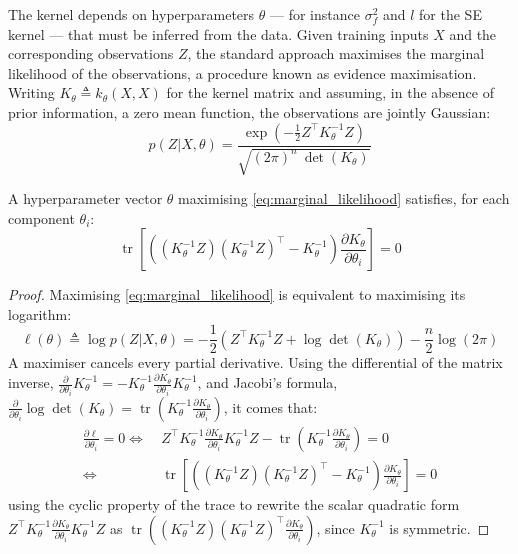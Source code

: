 The kernel depends on hyperparameters $\theta$ --- for instance $\sigma_f^2$ and $l$ for the SE kernel --- that must be inferred from the data. Given training inputs $X$ and the corresponding observations $Z$, the standard approach maximises the marginal likelihood of the observations, a procedure known as evidence maximisation. Writing $K_\theta\triangleq k_\theta(X,X)$ for the kernel matrix and assuming, in the absence of prior information, a zero mean function, the observations are jointly Gaussian:
\begin{equation}
	p(Z|X,\theta)=\frac{\displaystyle\exp\left(-\frac{1}{2}Z^\top K_\theta^{-1}Z\right)}{\sqrt{(2\pi)^n\:\operatorname{det}(K_\theta)}}\label{eq:marginal_likelihood}
\end{equation}

\begin{proposition}\label{th:GP_MLE}
	A hyperparameter vector $\theta$ maximising \eqref{eq:marginal_likelihood} satisfies, for each component $\theta_i$:
	\begin{equation}
		\operatorname{tr}\left[\left((K_\theta^{-1}Z)(K_\theta^{-1}Z)^\top-K_\theta^{-1}\right)\frac{\partial K_\theta}{\partial\theta_i}\right]=0\label{eq:GP_MLE}
	\end{equation}
\end{proposition}

\begin{proof}
	Maximising \eqref{eq:marginal_likelihood} is equivalent to maximising its logarithm:
	\begin{equation}
		\ell(\theta)\triangleq\log p(Z|X,\theta)=-\frac{1}{2}\left(Z^\top K_\theta^{-1}Z+\log\operatorname{det}(K_\theta)\right)-\frac{n}{2}\log(2\pi)
	\end{equation}
	A maximiser cancels every partial derivative. Using the differential of the matrix inverse, $\frac{\partial}{\partial\theta_i}K_\theta^{-1}=-K_\theta^{-1}\frac{\partial K_\theta}{\partial\theta_i}K_\theta^{-1}$, and Jacobi's formula, $\frac{\partial}{\partial\theta_i}\log\operatorname{det}(K_\theta)=\operatorname{tr}\left(K_\theta^{-1}\frac{\partial K_\theta}{\partial\theta_i}\right)$, it comes that:
	\begin{equation}
		\begin{aligned}
		\frac{\partial\ell}{\partial\theta_i}=0
		\iff&\:Z^\top K_\theta^{-1}\frac{\partial K_\theta}{\partial\theta_i}K_\theta^{-1}Z-\operatorname{tr}\left(K_\theta^{-1}\frac{\partial K_\theta}{\partial\theta_i}\right)=0\\
		\iff&\:\operatorname{tr}\left[\left((K_\theta^{-1}Z)(K_\theta^{-1}Z)^\top-K_\theta^{-1}\right)\frac{\partial K_\theta}{\partial\theta_i}\right]=0
		\end{aligned}
	\end{equation}
	using the cyclic property of the trace to rewrite the scalar quadratic form $Z^\top K_\theta^{-1}\frac{\partial K_\theta}{\partial\theta_i}K_\theta^{-1}Z$ as $\operatorname{tr}\left((K_\theta^{-1}Z)(K_\theta^{-1}Z)^\top\frac{\partial K_\theta}{\partial\theta_i}\right)$, since $K_\theta^{-1}$ is symmetric.
\end{proof}

